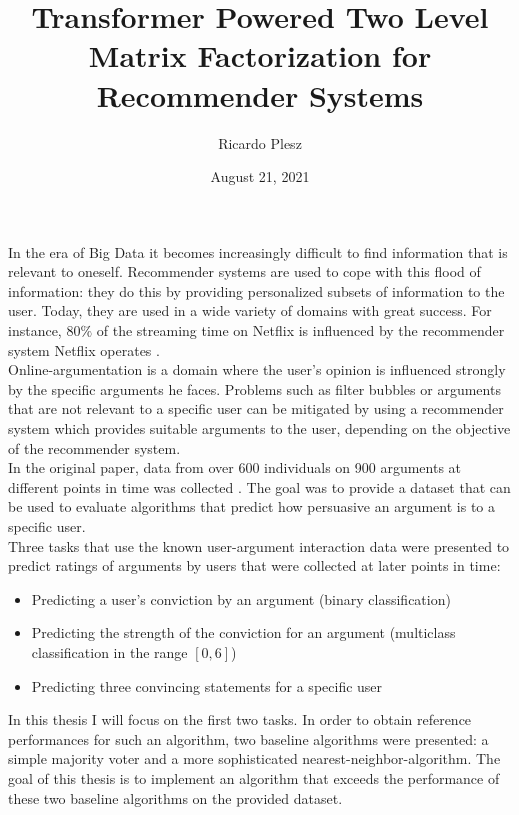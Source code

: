 \documentclass{article}
\title{\textbf{Transformer Powered Two Level Matrix Factorization for Recommender Systems}}
\author{Ricardo Plesz}
\date{August 21, 2021}
\begin{document}
    
\maketitle

In the era of Big Data it becomes increasingly difficult to find information that is relevant to oneself. 
Recommender systems are used to cope with this flood of information: 
they do this by providing personalized subsets of information to the user. 
Today, they are used in a wide variety of domains with great success. For instance, $80\%$ of the
streaming time on Netflix is influenced by the recommender system Netflix operates \cite{gomez2015netflix}. 
\\

Online-argumentation is a domain where the user's opinion is influenced strongly by the
specific arguments he faces. Problems such as filter bubbles or arguments that
are not relevant to a specific user can be mitigated by using a recommender system
which provides suitable arguments to the user, depending on the objective of the recommender system.\\
In the original paper, data from over 600 individuals on 900 arguments at different points in time was collected \cite{HowIArgue}.
The goal was to provide a dataset that can be used to evaluate algorithms that predict how persuasive 
an argument is to a specific user.\\
Three tasks that use the known user-argument interaction data were presented to predict ratings of arguments 
by users that were collected at later points in time:
\begin{itemize}
    \item Predicting a user's conviction by an argument (binary classification)
    \item Predicting the strength of the conviction for an argument (multiclass classification in the range $[0,6]$)
    \item Predicting three convincing statements for a specific user
\end{itemize}
In this thesis I will focus on the first two tasks.
In order to obtain reference performances for such an algorithm, two baseline algorithms
were presented: a simple majority voter and a more sophisticated nearest-neighbor-algorithm.
The goal of this thesis is to implement an algorithm that exceeds the performance of these two 
baseline algorithms on the provided dataset.
\\
\end{document}
